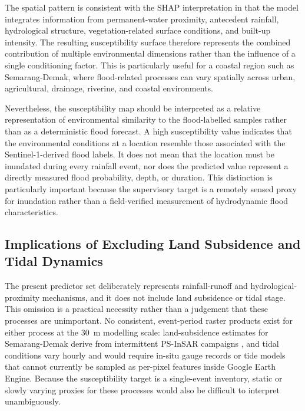 \documentclass[11pt,twoside]{article}
\begin{document}
The spatial pattern is consistent with the SHAP interpretation in that the model integrates information from permanent-water proximity, antecedent rainfall, hydrological structure, vegetation-related surface conditions, and built-up intensity. The resulting susceptibility surface therefore represents the combined contribution of multiple environmental dimensions rather than the influence of a single conditioning factor. This is particularly useful for a coastal region such as Semarang-Demak, where flood-related processes can vary spatially across urban, agricultural, drainage, riverine, and coastal environments.

Nevertheless, the susceptibility map should be interpreted as a relative representation of environmental similarity to the flood-labelled samples rather than as a deterministic flood forecast. A high susceptibility value indicates that the environmental conditions at a location resemble those associated with the Sentinel-1-derived flood labels. It does not mean that the location must be inundated during every rainfall event, nor does the predicted value represent a directly measured flood probability, depth, or duration. This distinction is particularly important because the supervisory target is a remotely sensed proxy for inundation rather than a field-verified measurement of hydrodynamic flood characteristics.

\subsection{Implications of Excluding Land Subsidence and Tidal Dynamics}\label{discussion-subsidence-tidal}

The present predictor set deliberately represents rainfall-runoff and
hydrological-proximity mechanisms, and it does not include land subsidence or
tidal stage. This omission is a practical necessity rather than a judgement
that these processes are unimportant. No consistent, event-period raster
products exist for either process at the 30~m modelling scale: land-subsidence
estimates for Semarang-Demak derive from intermittent PS-InSAR campaigns
\parencite{abidin2015}, and tidal conditions vary hourly and would require
in-situ gauge records or tide models that cannot currently be sampled as
per-pixel features inside Google Earth Engine. Because the susceptibility
target is a single-event inventory, static or slowly varying proxies for these
processes would also be difficult to interpret unambiguously.
\end{document}
